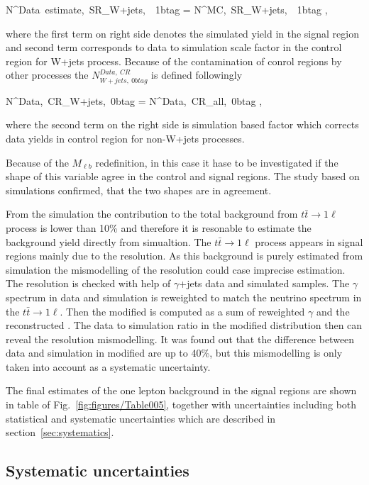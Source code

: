 {
N^{Data~estimate,~SR}_{W+jets,~\geq~1btag}  = N^{MC,~SR}_{W+jets,~\geq~1btag} \times  {},
}

where the first term on right side denotes the simulated yield in the signal region and second term corresponds to data to simulation scale factor in the control region for W+jets process. Because of the contamination of conrol regions by other processes the $N^{Data,~CR}_{W+jets,~0btag}$ is defined followingly


{
N^{Data,~CR}_{W+jets,~0btag} = N^{Data,~CR}_{all,~0btag} \times {} ,
}

where the second term on the right side is simulation based factor which corrects data yields in control region for non-W+jets processes.

Because of the $M_{\ell b}$ redefinition, in this case it hase to be investigated if the shape of this variable agree in the control and signal regions. The study based on simulations confirmed, that the two shapes are in agreement. 


From the simulation the contribution to the total background from $t\bar{t} \to 1\ell$ process is lower than 10\% and therefore it is resonable to estimate the background yield directly from simualtion. The $t\bar{t} \to 1\ell$ process appears in signal regions mainly due to the \MET resolution. As this background is purely estimated from simulation the mismodelling of the \MET resolution could case imprecise estimation. The \MET resolution is checked with help of $\gamma$+jets data and simulated samples. The $\gamma$ \pt spectrum in data and simulation is reweighted to match the neutrino \pt spectrum in the $t\bar{t} \to 1\ell$. Then the modified \MET is computed as a sum of reweighted $\gamma$ \pt and the reconstructed \MET. The data to simulation ratio in the modified \MET distribution then can reveal the \MET resolution mismodelling. It was found out that the difference between data and simulation in modified \MET are up to 40\%, but this mismodelling is only taken into account as a systematic uncertainty. %
 

The final estimates of the one lepton background in the signal regions are shown in table of Fig.~\ref{fig:figures/Table005}, together with uncertainties including both statistical and systematic uncertainties which are described in section~\ref{sec:systematics}.

\subsection{Systematic uncertainties~\label{sec:systematics}}

